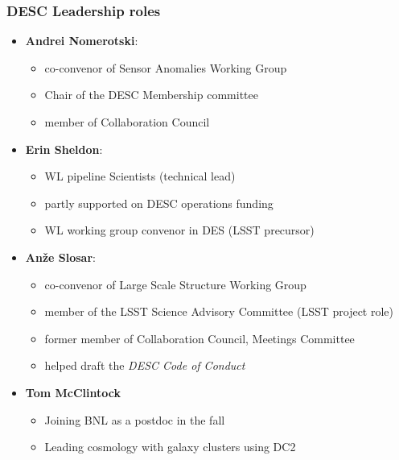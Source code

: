 \documentclass[aspectratio=169]{beamer}
\begin{document}
\begin{frame}
  \frametitle{DESC Leadership roles}

  \begin{itemize}
      \item \textbf{Andrei Nomerotski}:
          \begin{itemize}
              \item co-convenor of Sensor Anomalies Working Group
              \item Chair of the DESC Membership committee
              \item member of Collaboration Council
          \end{itemize}

      \item \textbf{Erin Sheldon}:
          \begin{itemize}
              \item WL pipeline Scientists (technical lead)
              \item partly supported on DESC  operations funding
              \item WL working group convenor in DES (LSST precursor)
          \end{itemize}

      \item \textbf{An\v{z}e Slosar}: 
          \begin{itemize}
              \item co-convenor of Large Scale Structure Working Group
              \item member of the LSST Science Advisory Committee (LSST project role)
              \item former member of Collaboration Council, Meetings Committee
              \item helped draft the \emph {DESC Code of Conduct}

        \end{itemize}

    \item \textbf{Tom McClintock}
        \begin{itemize}
            \item Joining BNL as a postdoc in the fall
            \item Leading cosmology with galaxy
                clusters using DC2
        \end{itemize}


\end{itemize}

\end{frame}
\end{document}
